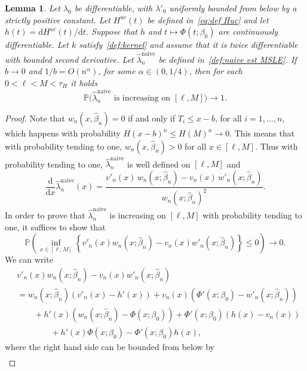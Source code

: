\documentclass[11pt,reqno]{amsart}
\theoremstyle{definition}
\theoremstyle{plain}
\newtheorem{lemma}[de]{Lemma}
\theoremstyle{remark}
\begin{document}
\begin{lemma}
\label{lem:monotone}
Let $\lambda_0$ be differentiable, with $\lambda'_0$ uniformly bounded from below by a strictly positive constant.
Let $H^{uc}(t)$ be defined in~\eqref{eq:def Huc} and let $h(t)=\mathrm{d}H^{uc}(t)/\mathrm{d}t$.
Suppose that $h$ and $t\mapsto\Phi(t;\beta_0)$ are continuously differentiable.
Let $k$ satisfy~\eqref{def:kernel} and assume that it is twice differentiable with bounded second derivative.
Let $\hat{\lambda}_n^{\mathrm{naive}}$ be defined in~\eqref{def:naive est MSLE}.
If $b\to0$ and $1/b=O(n^{\alpha})$, for some $\alpha\in(0,1/4)$,
then for each $0<\ell<M<\tau_H$  it holds
\[
{\mathbb{P}}\big(\hat{\lambda}_n^{\mathrm{naive}}\text{ is increasing on } [\ell,M]\big)\to 1.
\]
\end{lemma}
\begin{proof}
Note that $w_n(x,\hat{\beta}_n)=0$ if and only if $T_i\leq x-b$,
for all $i=1,\ldots,n$, which happens with probability $H(x-b)^n\leq H(M)^n\to 0$.
This means that with probability tending to one, $w_n(x,\hat{\beta}_n)>0$ for all $x\in[\ell,M]$.
Thus with probability tending to one,
$\hat{\lambda}_n^{\mathrm{naive}}$ is well defined on $[\ell,M]$ and
\begin{equation}
\label{eqn:der.naive}
\frac{\mathrm{d}}{\mathrm{d}x}\hat{\lambda}_n^{\mathrm{naive}}(x)=\frac{v'_n(x)\,w_n(x;\hat{\beta}_n)-v_n(x)\,w'_n(x;\hat{\beta}_n)}{w_n(x;\hat{\beta}_n)^2}.
\end{equation}
In order to prove that $\hat{\lambda}_n^{\mathrm{naive}} $ is increasing on $[\ell,M]$ with probability tending to one, it suffices to show that
\begin{equation}
\label{eq:prob inf}
{\mathbb{P}}\left(
\inf_{x\in[\ell,M]}
\left\{
v'_n(x)w_n(x;\hat{\beta}_n)-v_n(x)w'_n(x;\hat{\beta}_n)
\right\}\leq 0
\right)\to 0.
\end{equation}
We can write
\[
\begin{split}
&
v'_n(x)w_n(x;\hat{\beta}_n)-v_n(x)w'_n(x;\hat{\beta}_n)\\
&=
w_n(x;\hat{\beta}_n)
\left(v'_n(x)-h'(x)\right)+v_n(x)\left(\Phi'(x;\beta_0)-w'_n(x;\hat{\beta}_n)\right)\\
&\qquad+
h'(x)\left(w_n(x;\hat{\beta}_n)-\Phi(x;\beta_0)\right)+\Phi'(x;\beta_0)\left(h(x)-v_n(x)\right)\\
&\qquad\qquad+
h'(x)\Phi(x;\beta_0)-\Phi'(x;\beta_0)h(x),
\end{split}
\]
where the right hand side can be bounded from below by
\[
\begin{split}

\end{split}\]
\end{proof}
\end{document}
